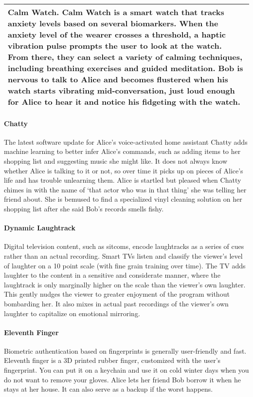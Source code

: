 \begin{tabular}{|p{}|}
\hline
\textbf{Calm Watch.}
Calm Watch is a smart watch that tracks anxiety levels based on several biomarkers. When the anxiety level of the wearer crosses a threshold, a haptic vibration pulse prompts the user to look at the watch. From there, they can select a variety of calming techniques, including breathing exercises and guided meditation. Bob is nervous to talk to Alice and becomes flustered when his watch starts vibrating mid-conversation, just loud enough for Alice to hear it and notice his fidgeting with the watch.\\ \hline
\end{tabular}

\paragraph{Chatty}
The latest software update for Alice's voice-activated home assistant Chatty adds machine learning to better infer Alice's commands, such as adding items to her shopping list and suggesting music she might like. It does not always know whether Alice is talking to it or not, so over time it picks up on pieces of Alice's life and has trouble unlearning them. Alice is startled but pleased when Chatty chimes in with the name of `that actor who was in that thing' she was telling her friend about. She is bemused to find a specialized vinyl cleaning solution on her shopping list after she said Bob's records smells fishy.

\paragraph{ Dynamic Laughtrack}
Digital television content, such as sitcoms, encode laughtracks as a series of cues rather than an actual recording. Smart TVs listen and classify the viewer's level of laughter on a 10 point scale (with fine grain training over time). The TV adds laughter to the content in a sensitive and considerate manner, where the laughtrack is only marginally higher on the scale than the viewer's own laughter. This gently nudges the viewer to greater enjoyment of the program without bombarding her. It also mixes in actual past recordings of the viewer's own laughter to capitalize on emotional mirroring.

\paragraph{Eleventh Finger}
Biometric authentication based on fingerprints is generally user-friendly and fast. Eleventh finger is a 3D printed rubber finger, customized with the user's fingerprint. You can put it on a keychain and use it on cold winter days when you do not want to remove your gloves. Alice lets her friend Bob borrow it when he stays at her house. It can also serve as a backup if the worst happens.

